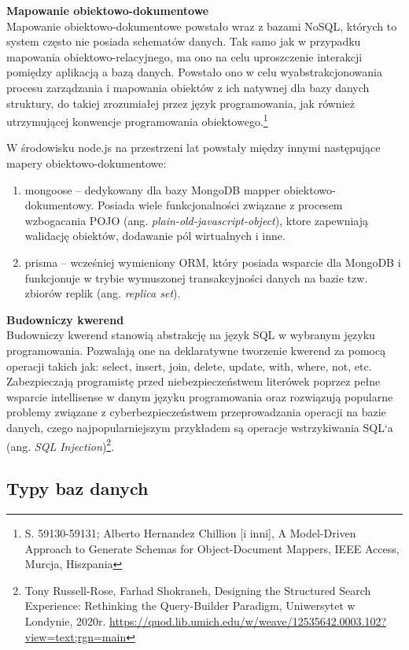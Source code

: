 \documentclass[12pt, a4paper, twoside, openany]{book}
\newcommand{\forceindent}{\leavevmode{\parindent=1.3em\indent}}
\begin{document}
\newpage
\textbf{Mapowanie obiektowo-dokumentowe\\}
\forceindent Mapowanie obiektowo-dokumentowe powstało wraz z bazami NoSQL, których to system często nie posiada schematów danych.
Tak samo jak w przypadku mapowania obiektowo-relacyjnego, ma ono na celu uproszczenie interakcji pomiędzy aplikacją a bazą danych. Powstało ono w celu wyabstrakcjonowania procesu zarządzania i mapowania obiektów z ich natywnej dla bazy danych struktury, do takiej zrozumiałej przez język programowania, jak również utrzymującej konwencje programowania obiektowego.\footnote{S. 59130-59131; Alberto Hernandez Chillion [i inni], A Model-Driven Approach to Generate Schemas for Object-Document Mappers, IEEE Access, Murcja, Hiszpania}

W środowisku node.js na przestrzeni lat powstały między innymi następujące mapery obiektowo-dokumentowe:
\begin{enumerate}[label=--]
    \item mongoose -- dedykowany dla bazy MongoDB mapper obiektowo-dokumentowy. Posiada wiele funkcjonalności związane z procesem wzbogacania POJO (ang. \textit{plain-old-javascript-object}), ktore zapewniają walidację obiektów, dodawanie pól wirtualnych i inne.
    \item prisma -- wcześniej wymieniony ORM, który posiada wsparcie dla MongoDB i funkcjonuje w trybie wymuszonej transakcyjności danych na bazie tzw. zbiorów replik (ang. \textit{replica set}).
\end{enumerate}

\textbf{Budowniczy kwerend\\}
\forceindent  Budowniczy kwerend stanowią abstrakcję na język SQL w wybranym języku programowania.
Pozwalają one na deklaratywne tworzenie kwerend za pomocą operacji takich jak: select, insert, join, delete, update, with, where, not, etc.
Zabezpieczają programistę przed niebezpieczeństwem literówek poprzez pełne wsparcie intellisense w danym języku programowania oraz rozwiązują popularne problemy związane z cyberbezpieczeństwem przeprowadzania operacji na bazie danych, czego najpopularniejszym przykładem są operacje wstrzykiwania SQL`a (ang. \textit{SQL Injection})\footnote{Tony Russell-Rose, Farhad Shokraneh, Designing the Structured Search Experience: Rethinking the Query-Builder Paradigm, Uniwersytet w Londynie, 2020r. \url{https://quod.lib.umich.edu/w/weave/12535642.0003.102?view=text;rgn=main}}.

\subsection{Typy baz danych}
\end{document}
